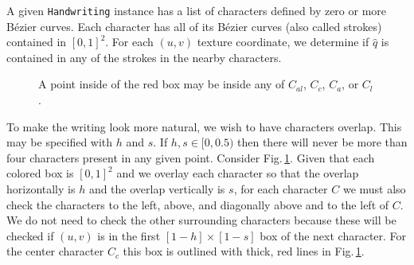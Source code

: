 \documentclass[12pt]{article}
\begin{document}
A given \texttt{Handwriting} instance has a list of characters defined by zero or more B\'ezier curves. Each character has all of its B\'ezier curves (also called strokes) contained in $[0,1]^2$. For each $(u,v)$ texture coordinate, we determine if $\hat{q}$ is contained in any of the strokes in the nearby characters.

\begin{figure}[ht]
\centering
{}
\label{character-boxes}
\caption{A point inside of the red box may be inside any of $C_{al}$, $C_c$, $C_a$, or $C_l$.}
\end{figure}

To make the writing look more natural, we wish to have characters overlap. This may be specified with $h$ and $s$. If $h,s \in [0,0.5)$ then there will never be more than four characters present in any given point. Consider Fig.\,\ref{character-boxes}. Given that each colored box is $[0,1]^2$ and we overlay each character so that the overlap horizontally is $h$ and the overlap vertically is $s$, for each character $C$ we must also check the characters to the left, above, and diagonally above and to the left of $C$. We do not need to check the other surrounding characters because these will be checked if $(u,v)$ is in the first $[1-h] \times [1-s]$ box of the next character. For the center character $C_c$ this box is outlined with thick, red lines in Fig.\,\ref{character-boxes}.
\end{document}

